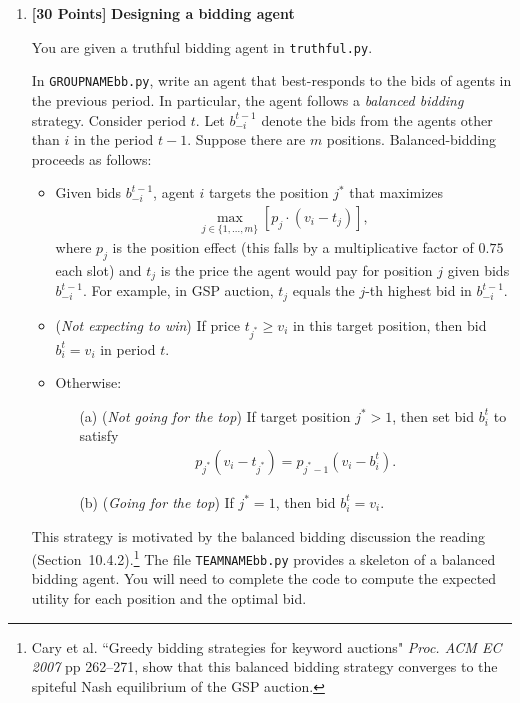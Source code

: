 \documentclass[11pt]{article}
\newcommand{\points}[1]{\textbf{[#1 Points]}}
\begin{document}
	\begin{enumerate}

		\item\points{30} {\bf Designing a bidding agent}

You are given a truthful bidding agent in \verb+truthful.py+.

In
\verb+GROUPNAMEbb.py+, write an agent that best-responds to the
bids of agents in the previous period. In particular, the agent follows
a {\em balanced bidding} strategy.  Consider period $t$.
Let $b_{-i}^{t-1}$ denote the bids from the
agents other than $i$ in the  period $t-1$.
Suppose there are $m$ positions. Balanced-bidding
proceeds as follows:
%
\begin{itemize}
\item Given bids $b_{-i}^{t-1}$, agent $i$
targets the position $j^\ast$ that maximizes
%
\begin{align}
\max_{j\in\{1,\ldots,m\}} [p_j\cdot (v_i - t_j)],
\end{align}
%
where $p_j$ is the position effect (this falls by a multiplicative
factor of $0.75$ each slot) and $t_j$ is the price the agent would pay
for position $j$ given bids $b^{t-1}_{-i}$. For example, in GSP auction, $t_j$
equals the $j$-th highest bid in $b_{-i}^{t-1}$.

%
\item ({\em Not expecting to win})
If price $t_{j^\ast}\geq v_i$ in this target position,
then bid $b^t_i=v_i$ in period $t$.
%
		\item Otherwise:
%
\begin{itemize}
\item[(a)] ({\em Not going for the top}) If target position $j^\ast>1$,
then set  bid $b^t_i$ to satisfy
%
\begin{align}
p_{j^\ast}(v_i - t_{j^\ast}) = p_{j^\ast-1}(v_i - b^t_i).
\end{align}
%
%
\item[(b)] ({\em Going for the top}) If $j^\ast=1$,
then bid
$b^t_i=v_i$.
\end{itemize}
	\end{itemize}

        This strategy is motivated by the balanced bidding discussion
        the reading (Section~10.4.2).\footnote{Cary et al.  ``Greedy
          bidding strategies for keyword auctions" {\em Proc.  ACM EC
            2007} pp 262--271, show that this balanced bidding
          strategy converges to the spiteful Nash equilibrium of the
          GSP auction.}
%
	The file \verb+TEAMNAMEbb.py+ provides a skeleton of a
        balanced bidding agent. You will need to complete
the code to compute the  expected
        utility for each position and the optimal bid.


\end{enumerate}
\end{document}
